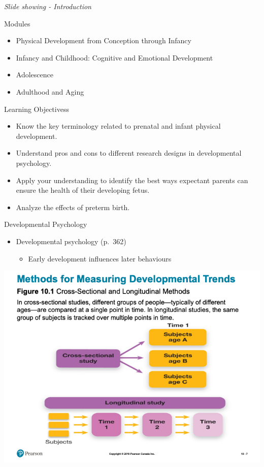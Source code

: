 \documentclass[
]{book}
\providecommand{\tightlist}{%
  \setlength{\itemsep}{0pt}\setlength{\parskip}{0pt}}
\begin{document}
\begin{reflect}
\emph{Slide showing - Introduction}

Modules

\begin{itemize}
\tightlist
\item
  Physical Development from Conception through Infancy\\
\item
  Infancy and Childhood: Cognitive and Emotional Development\\
\item
  Adolescence\\
\item
  Adulthood and Aging
\end{itemize}

Learning Objectivess

\begin{itemize}
\tightlist
\item
  Know the key terminology related to prenatal and infant physical development.\\
\item
  Understand pros and cons to different research designs in developmental psychology.\\
\item
  Apply your understanding to identify the best ways expectant parents can ensure the health of their developing fetus.\\
\item
  Analyze the effects of preterm birth.
\end{itemize}

Developmental Psychology

\begin{itemize}
\tightlist
\item
  Developmental psychology (p.~362)

  \begin{itemize}
  \tightlist
  \item
    Early development influences later behaviours
  \end{itemize}
\end{itemize}

\includegraphics{assets/unit_3/slide_7.png}


\end{reflect}
\end{document}
